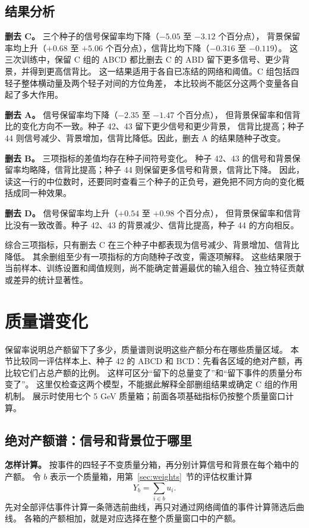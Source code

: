 \documentclass[11pt,a4paper,fontset=fandol,scheme=plain]{ctexart}
\begin{document}
\subsection{结果分析}
\textbf{删去 C。} 三个种子的信号保留率均下降（$-5.05$ 至 $-3.12$ 个百分点），
背景保留率均上升（$+0.68$ 至 $+5.06$ 个百分点），信背比均下降（$-0.316$ 至 $-0.119$）。
这三次训练中，保留 C 组的 ABCD 都比删去 C 的 ABD 留下更多信号、更少背景，并得到更高信背比。
这一结果适用于各自已冻结的网络和阈值。C 组包括四轻子整体横动量及两个轻子对间的方位角差，
本比较尚不能区分这两个变量各自起了多大作用。

\textbf{删去 A。} 信号保留率均下降（$-2.35$ 至 $-1.47$ 个百分点），
但背景保留率和信背比的变化方向不一致。种子 42、43 留下更少信号和更少背景，
信背比提高；种子 44 则信号减少、背景增加，信背比降低。因此，删去 A 的结果随种子改变。

\textbf{删去 B。} 三项指标的差值均存在种子间符号变化。
种子 42、43 的信号和背景保留率均略降，信背比提高；种子 44 则保留更多信号和背景，信背比下降。
因此，读这一行的中位数时，还要同时查看三个种子的正负号，避免把不同方向的变化概括成同一种效果。

\textbf{删去 D。} 信号保留率均上升（$+0.54$ 至 $+0.98$ 个百分点），
但背景保留率和信背比没有一致改善。种子 42、43 的背景减少、信背比提高，种子 44 的方向相反。

综合三项指标，只有删去 C 在三个种子中都表现为信号减少、背景增加、信背比降低。
其余删组至少有一项指标的方向随种子改变，需逐项解释。
这些结果限于当前样本、训练设置和阈值规则，尚不能确定普遍最优的输入组合、独立特征贡献或差异的统计显著性。
\FloatBarrier

\section{质量谱变化}
保留率说明总产额留下了多少，质量谱则说明这些产额分布在哪些质量区域。
本节比较同一评估样本上、种子 42 的 ABCD 和 BCD：先看各区域的绝对产额，再比较它们占总产额的比例。
这样可区分“留下的总量变了”和“留下事件的质量分布变了”。
这里仅检查这两个模型，不能据此解释全部删组结果或确定 C 组的作用机制。
展示时使用七个 5 GeV 质量箱；前面各项基础指标仍按整个质量窗口计算。

\subsection{绝对产额谱：信号和背景位于哪里}
\textbf{怎样计算。} 按事件的四轻子不变质量分箱，再分别计算信号和背景在每个箱中的产额。
令 $b$ 表示一个质量箱，用第~\ref{sec:weights}~节的评估权重计算
\[
 Y_b=\sum_{i\in b}u_i.
\]
先对全部评估事件计算一条筛选前曲线，再只对通过网络阈值的事件计算筛选后曲线。
各箱的产额相加，就是对应选择在整个质量窗口中的产额。
\end{document}
